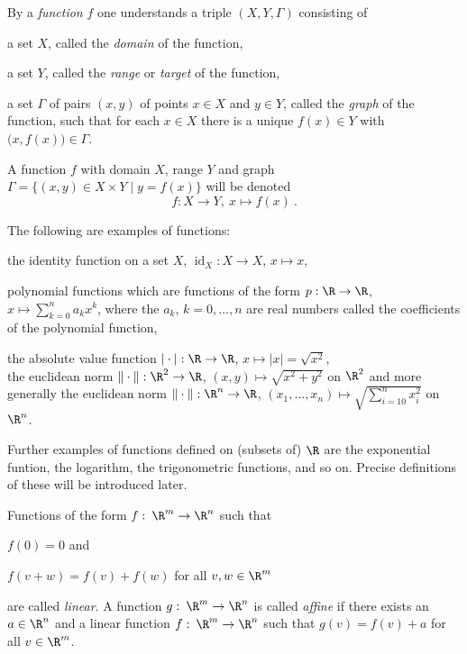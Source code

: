 
\begin{definition}
\label{def:function}
  By a \emph{function} $f$ one understands a triple $(X,Y,\Gamma)$ consisting of
  \begin{letterlist}
  \item a set $X$, called the \emph{domain} of the function, 
  \item a set $Y$, called the \emph{range} or \emph{target} of the function,
  \item a set $\Gamma$ of pairs $(x,y)$ of points $x\in X$ and  $y\in Y$, 
  called the \emph{graph} of the function,  such that for each $x\in X$ 
  there is a unique $f(x)\in Y$ with $\big( x,f(x)\big) \in \Gamma$. 
  \end{letterlist}
  A function $f$ with domain $X$, range $Y$ and graph 
  $\Gamma = \{ (x,y) \in X \times Y \mid y = f(x) \}$ will be denoted
  \[
    f:X \rightarrow Y, \: x \mapsto f(x) \ .
  \]
\end{definition}
\begin{example}
  The following are examples of functions:
  \begin{letterlist}
  \item 
   the identity function on a set $X$, $\operatorname{id}_X : X \rightarrow X$,
   $x\mapsto x$,
  \item 
   polynomial functions which are functions of the form  $p: \R \to \R$, 
   $x \mapsto \sum_{k=0}^n a_k x^k$, where the $a_k$, $k= 0, \ldots ,n$ are real numbers 
   called the coefficients of the polynomial function,
  \item
   the absolute value  function $ | \cdot |  :\R \rightarrow \R$, $x \mapsto |x| = \sqrt{x^2}$, \\[2mm]
   the euclidean norm $ \| \cdot \|  :\R^2 \rightarrow \R$, $(x,y) \mapsto \sqrt{x^2 + y^2}$ on $\R^2$ and 
    more generally the euclidean norm  
    $ \| \cdot \| :\R^n \rightarrow \R$, $(x_1,\ldots , x_n) \mapsto \sqrt{\sum_{i=10}^nx_i^2}$
    on $\R^n$.
  \end{letterlist}
  Further examples of functions defined on (subsets of) $\R$ are the exponential funtion, the logarithm, the trigonometric functions, and so on. Precise definitions of these will be introduced later. 
\end{example}

\begin{definition}
  Functions of the form $f:\:\R^m \rightarrow \R^n$ such that 
  \begin{axiomlist}[L]
  \item $f (0) = 0$ and
  \item $f(v+w) = f(v) + f(w)$ for all $v,w \in \R^m$ 
  \end{axiomlist}
  are called \emph{linear}. A function $g: \:\R^m \rightarrow \R^n$ is called \emph{affine} if
  there exists an $a \in \R^n$ and a linear function $f: \:\R^m \rightarrow \R^n$ such that
  $g(v) = f(v)+ a$ for all $v\in \R^m$.
\end{definition}

